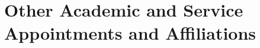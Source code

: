 \documentclass[11pt,letterpaper]{report}
\begin{document}






\section*{Other Academic and Service Appointments and Affiliations}
\end{document}
